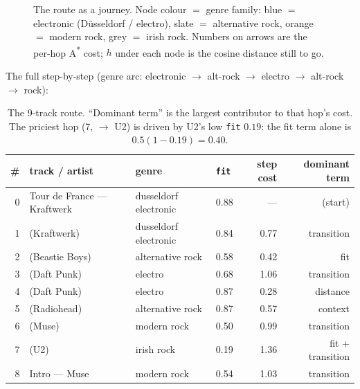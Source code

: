 \documentclass[11pt]{article}
\newcommand{\code}[1]{\texttt{\small #1}}
\begin{document}
\begin{figure}[H]\centering
{}
\caption{The route as a journey. Node colour $=$ genre family: blue $=$ electronic (Düsseldorf /
electro), slate $=$ alternative rock, orange $=$ modern rock, grey $=$ irish rock. Numbers on arrows
are the per-hop A\textsuperscript{*} cost; $h$ under each node is the cosine distance still to go.}
\label{fig:strip}
\end{figure}

The full step-by-step (genre arc: electronic $\to$ alt-rock $\to$ electro $\to$ alt-rock $\to$ rock):

\begin{table}[H]\centering\small
\begin{tabular}{@{}rlllrr@{}}
\toprule
\# & track / artist & genre & \code{fit} & step cost & dominant term \\
\midrule
0 & Tour de France --- Kraftwerk & dusseldorf electronic & 0.88 & --- & (start) \\
1 & (Kraftwerk) & dusseldorf electronic & 0.84 & 0.77 & transition \\
2 & (Beastie Boys) & alternative rock & 0.58 & 0.42 & fit \\
3 & (Daft Punk) & electro & 0.68 & 1.06 & transition \\
4 & (Daft Punk) & electro & 0.87 & 0.28 & distance \\
5 & (Radiohead) & alternative rock & 0.87 & 0.57 & context \\
6 & (Muse) & modern rock & 0.50 & 0.99 & transition \\
7 & (U2) & irish rock & 0.19 & 1.36 & fit + transition \\
8 & Intro --- Muse & modern rock & 0.54 & 1.03 & transition \\
\bottomrule
\end{tabular}
\caption{The 9-track route. ``Dominant term'' is the largest contributor to that hop's cost. The
priciest hop (7, $\to$ U2) is driven by U2's low \code{fit} $0.19$: the fit term alone is
$0.5(1-0.19)=0.40$.}
\end{table}
\end{document}
